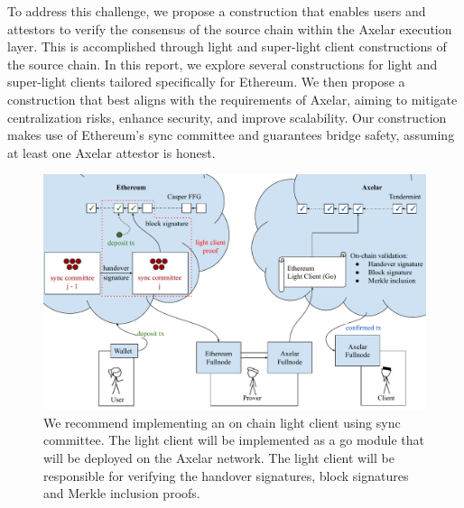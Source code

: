 

To address this challenge, we propose a construction that enables users and attestors to verify the consensus of the source chain within the Axelar execution layer. This is accomplished through light and super-light client constructions of the source chain. In this report, we explore several constructions for light and super-light clients tailored specifically for Ethereum. We then propose a construction that best aligns with the requirements of Axelar, aiming to mitigate centralization risks, enhance security, and improve scalability. Our construction makes use of Ethereum's sync committee and guarantees bridge safety, assuming at least one Axelar attestor is honest.

\begin{figure}
    \includegraphics[scale=0.55]{figures/axelar_light_client_architecture.pdf}
    \caption{We recommend implementing an on chain light client using sync committee. The light client will be implemented as a go module that will be deployed on the Axelar network. The light client will be responsible for verifying the handover signatures, block signatures and Merkle inclusion proofs.}
    \label{fig.axelar_light_client_architecture}
\end{figure}



